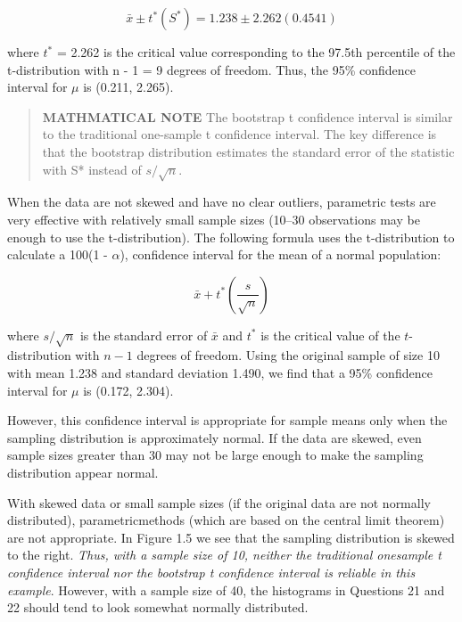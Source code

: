 \documentclass[
]{book}
\begin{document}
\begin{equation} 
  \bar{x} \pm t^*\left(S^*\right) = 1.238 \pm 2.262(0.4541)
  \tag{}
\end{equation}

where \(t^*\) = 2.262 is the critical value corresponding to the 97.5th percentile of the t-distribution with n - 1 = 9 degrees of freedom. Thus, the 95\% confidence interval for \(\mu\) is (0.211, 2.265).

\begin{quote}
\textbf{MATHMATICAL NOTE} The bootstrap t confidence interval is similar to the traditional one-sample t confidence interval. The key difference is that the bootstrap distribution estimates the standard error of the statistic with S* instead of \(s/ \sqrt{n}\).
\end{quote}

When the data are not skewed and have no clear outliers, parametric tests are very effective with relatively small sample sizes (10--30 observations may be enough to use the t-distribution). The following formula uses the t-distribution to calculate a 100(1 - \(\alpha\)), confidence interval for the mean of a normal population:

\begin{equation} 
  \bar{x} + t^*\left(\frac{s}{\sqrt{n}}\right)
  \tag{1.2} \label{eq:1_2}
\end{equation}

where \(s/\sqrt{n}\) is the standard error of \(\bar{x}\) and \(t^*\) is the critical value of the \(t\)-distribution with \(n - 1\) degrees of freedom. Using the original sample of size 10 with mean 1.238 and standard deviation 1.490, we find that a 95\% confidence interval for \(\mu\) is (0.172, 2.304).

However, this confidence interval is appropriate for sample means only when the sampling distribution is approximately normal. If the data are skewed, even
sample sizes greater than 30 may not be large enough to make the sampling distribution appear normal.

With skewed data or small sample sizes (if the original data are not normally distributed), parametricmethods (which are based on the central limit theorem) are not appropriate. In Figure 1.5 we see that the sampling distribution is skewed to the right. \emph{Thus, with a sample size of 10, neither the traditional onesample
t confidence interval nor the bootstrap t confidence interval is reliable in this example}. However, with a sample size of 40, the histograms in Questions 21 and 22 should tend to look somewhat normally distributed.
\end{document}
